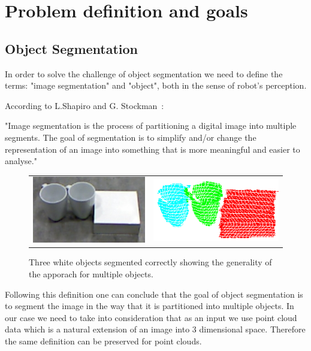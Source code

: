 \section{Problem definition and goals}

\subsection{Object Segmentation} 

In order to solve the challenge of object segmentation we need to define the terms: "image segmentation" and "object", both in the sense of robot's perception. 


According to L.Shapiro and G. Stockman~\cite{shapiro2001computer}:

\noindent "Image segmentation is the process of partitioning a digital image into multiple segments. The goal of segmentation is to simplify and/or change the representation of an image into something that is more meaningful and easier to analyse."

\begin{figure}[ht]
\begin{tabular}{cccc}

\multicolumn{2}{c}{\includegraphics[width=0.45\columnwidth]{figures/3objects/after_push.jpg}}
& \multicolumn{2}{c}{\includegraphics[width=0.45\columnwidth]{figures/3objects/segmented.png}}

\end{tabular}
\caption{Three white objects segmented correctly showing the generality of the apporach for multiple objects.}
\label{fig:three_objects}
\end{figure}


 Following this definition one can conclude that the goal of object segmentation is to segment the image in the way that it is partitioned into multiple objects. In our case we need to take into consideration that as an input we use point cloud data which is a natural extension of an image into 3 dimensional space. Therefore the same definition can be preserved for point clouds. 

